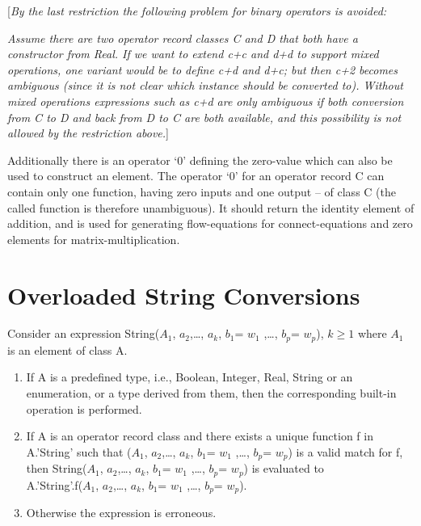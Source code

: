 \documentclass[10pt,a4paper]{report}
\def\doublelabel#1{\label{#1}}
\renewcommand{\labelenumi}{\arabic{enumi}.}
\begin{document}
{[}\emph{By the last restriction the following problem for binary
operators is avoided: }

\emph{Assume there are two operator record classes C and D that both
have a constructor from Real. If we want to extend c+c and d+d to
support mixed operations, one variant would be to define c+d and d+c;
but then c+2 becomes ambiguous (since it is not clear which instance
should be converted to). Without mixed operations expressions such as
c+d are only ambiguous if both conversion from C to D and back from D to
C are both available, and this possibility is not allowed by the
restriction above.}{]}

Additionally there is an operator `0' defining the zero-value which can
also be used to construct an element. The operator `0' for an operator
record C can contain only one function, having zero inputs and one
output -- of class C (the called function is therefore unambiguous). It
should return the identity element of addition, and is used for
generating flow-equations for connect-equations and zero elements for
matrix-multiplication.

\section{Overloaded String Conversions}\doublelabel{overloaded-string-conversions}

Consider an expression String($A_1$,
$a_{2}$,\ldots{}, $a_{k}$, $b_{1}$=
$w_{1}$ ,\ldots{}, $b_{p}$= $w_{p}$), $k\ge 1$ where $A_1$ is an element of class A.

\begin{enumerate}
\def\labelenumi{\arabic{enumi}.}
\item
  If A is a predefined {type}, i.e., Boolean, Integer, Real, String or
  an enumeration, or a type derived from them, then the corresponding
  built-in operation is performed.
\item
  If A is an operator {record class} and there exists a unique function
  f in A.'String' such that ($A_1$,
  $a_{2}$,\ldots{}, $a_{k}$, $b_{1}$=
  $w_{1}$ ,\ldots{}, $b_{p}$= $w_{p}$)
  is a valid match for f, then String($A_1$,
  $a_{2}$,\ldots{}, $a_{k}$, $b_{1}$=
  $w_{1}$ ,\ldots{}, $b_{p}$= $w_{p}$)
  is evaluated to\\
  A.'String'.f($A_1$, $a_{2}$,\ldots{},
  $a_{k}$, $b_{1}$= $w_{1}$ ,\ldots{},
  $b_{p}$= $w_{p}$).
\item
  Otherwise the expression is erroneous.
\end{enumerate}
\end{document}
